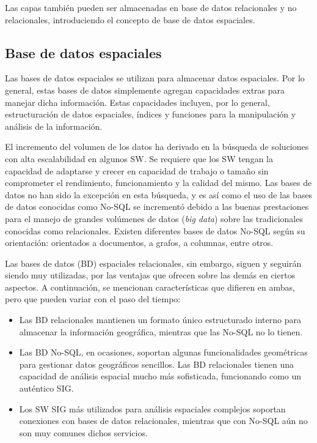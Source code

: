 Las capas también pueden ser almacenadas en base de datos relacionales y no relacionales, introduciendo el concepto de base de datos espaciales.


\subsection{Base de datos espaciales}

Las bases de datos espaciales se utilizan para almacenar datos espaciales. Por lo general, estas bases de datos simplemente agregan capacidades extras para manejar dicha información. Estas capacidades incluyen, por lo general, estructuración de datos espaciales, índices y funciones para la manipulación y análisis de la información.

El incremento del volumen de los datos ha derivado en la búsqueda de soluciones con alta escalabilidad en algunos SW. Se requiere que los SW tengan la capacidad de adaptarse y crecer en capacidad de trabajo o tamaño sin comprometer el rendimiento, funcionamiento y la calidad del mismo. Las bases de datos no han sido la excepción en esta búsqueda, y es así como el uso de las bases de datos conocidas como No-SQL se incrementó debido a las buenas prestaciones para el manejo de grandes volúmenes de datos (\textit{big data}) sobre las tradicionales conocidas como relacionales. Existen diferentes bases de datos No-SQL según su orientación: orientados a documentos, a grafos, a columnas, entre otros.

Las bases de datos (BD) espaciales relacionales, sin embargo, siguen y seguirán siendo muy utilizadas, por las ventajas que ofrecen sobre las demás en ciertos aspectos. A continuación, se mencionan características que difieren en ambas, pero que pueden variar con el paso del tiempo:

\begin{itemize}
    \item Las BD relacionales mantienen un formato único estructurado interno para almacenar la información geográfica, mientras que las No-SQL no lo tienen.
    \item Las BD No-SQL, en ocasiones, soportan algunas funcionalidades geométricas para gestionar datos geográficos sencillos. Las BD relacionales tienen una capacidad de análisis espacial mucho más sofisticada, funcionando como un auténtico SIG.
    \item Los SW SIG más utilizados para análisis espaciales complejos soportan conexiones con bases de datos relacionales, mientras que con No-SQL aún no son muy comunes dichos servicios.
\end{itemize}

